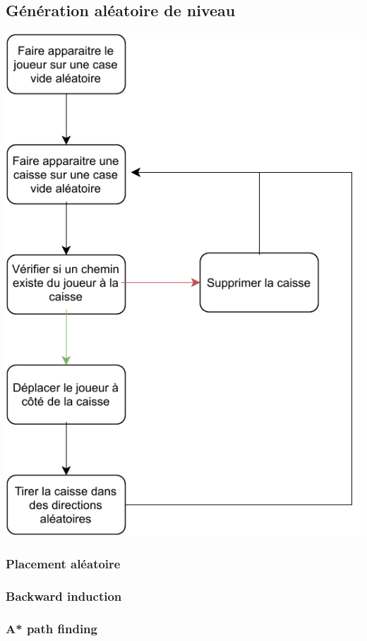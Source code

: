 \documentclass[../main.tex]{subfiles}
\begin{document}
\subsection{Génération aléatoire de niveau}
\includegraphics[width=1\textwidth]{images/generation.pdf}
\subsubsection{Placement aléatoire}
\subsubsection{Backward induction}
\subsubsection{A* path finding}
\end{document}
